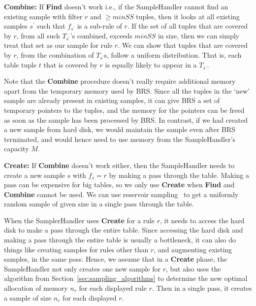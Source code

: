 {\item \textbf{Combine:} If \textbf{Find} doesn't work i.e., if the SampleHandler cannot find an existing sample with filter $r$ and $\geq minSS$ tuples, then it looks at all existing samples $s^{\prime}$ such that $f_{s^{\prime}}$ is a sub-rule of $r$. If the set of all tuples that are covered by $r$, from all such $T_{s^{\prime}}$'s combined, exceeds $minSS$ in size, then we can simply treat that set as our sample for rule $r$.
We can show that tuples that are covered by $r$, from the combination of $T_{s^{\prime}}$s, follow a uniform distribution. That is, each table tuple $t$ that is covered by $r$ is equally likely to appear in a $T_{s^{\prime}}$. 

Note that the \textbf{Combine} procedure doesn't really require additional memory apart from the temporary memory used by BRS. Since all the tuples in the `new' sample are already present in existing samples, it can give BRS a set of temporary pointers to the tuples, and the memory for the pointers can be freed as soon as the sample has been processed by BRS. In contrast, if we had created a new sample from hard disk, we would maintain the sample even after BRS terminated, and would hence need to use memory from the SampleHandler's capacity $M$.

\item \textbf{Create:} If \textbf{Combine} doesn't work either, then the SampleHandler needs to create a new sample $s$ with $f_s = r$ by making a pass through the table. Making a pass can be expensive for big tables, so we only use \textbf{Create} when \textbf{Find} and \textbf{Combine} cannot be used. We can use reservoir sampling~\cite{maibdr1983,Vitter:1985:RSR:3147.3165} to get a uniformly random sample of given size in a single pass through the table. 

When the SamplerHandler uses \textbf{Create} for a rule $r$, it needs to access the hard disk to make a pass through the entire table. Since accessing the hard disk and making a pass through the entire table is usually a bottleneck, it can also do things like creating samples for rules other than $r$, and augmenting existing samples, in the same pass. Hence, we assume that in a \textbf{Create} phase, the SampleHandler not only creates one new sample for $r$, but also uses the algorithm from Section~\ref{sec:sampling_algorithms} to determine the new optimal allocation of memory $n_r$ for each displayed rule $r$. Then in a single pass, it creates a sample of size $n_r$ for each displayed $r$. 
\squishend

}

